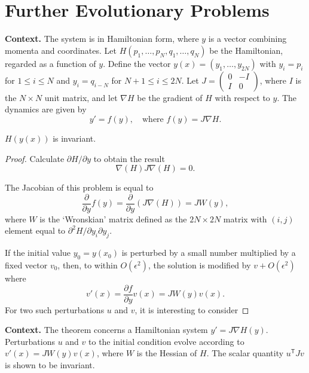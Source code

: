 \section{Further Evolutionary Problems}

\noindent\textbf{Context.}
The system is in Hamiltonian form, where $y$ is a vector combining momenta and coordinates. Let $H(p_1,\dots,p_N,q_1,\dots,q_N)$ be the Hamiltonian, regarded as a function of $y$. Define the vector $y(x) = (y_1,\dots,y_{2N})$ with $y_i = p_i$ for $1 \le i \le N$ and $y_i = q_{i-N}$ for $N+1 \le i \le 2N$. Let $J = \begin{pmatrix} 0 & -I \\ I & 0 \end{pmatrix}$, where $I$ is the $N \times N$ unit matrix, and let $\nabla H$ be the gradient of $H$ with respect to $y$. The dynamics are given by
\begin{equation}
y' = f(y), \quad \text{where } f(y) = J \nabla H.
\end{equation}

\begin{theorem}

  \label{thm:123A}
$H(y(x))$ is invariant.
\end{theorem}

\begin{proof}
Calculate $\partial H/\partial y$ to obtain the result
\[
\nabla(H) J\nabla(H) = 0.
\]

The Jacobian of this problem is equal to
\[
\frac{\partial}{\partial y} f(y) = \frac{\partial}{\partial y} (J\nabla(H)) = J W(y),
\]
where $W$ is the `Wronskian' matrix defined as the $2N \times 2N$ matrix with $(i, j)$ element equal to $\partial^2 H/\partial y_i \partial y_j$.

If the initial value $y_0 = y(x_0)$ is perturbed by a small number multiplied by a fixed vector $v_0$, then, to within $O(\epsilon^2)$, the solution is modified by $v + O(\epsilon^2)$ where
\[
v'(x) = \frac{\partial f}{\partial y} v(x) = J W(y) v(x).
\]
For two such perturbations $u$ and $v$, it is interesting to consider
\end{proof}

\noindent\textbf{Context.}
The theorem concerns a Hamiltonian system $y' = J\nabla H(y)$. Perturbations $u$ and $v$ to the initial condition evolve according to $v'(x) = JW(y)v(x)$, where $W$ is the Hessian of $H$. The scalar quantity $u^\mathsf{T}Jv$ is shown to be invariant.

